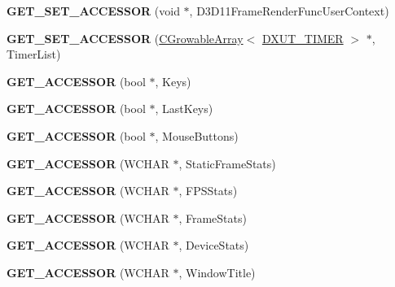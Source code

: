 \begin{DoxyCompactItemize}
\item 
\hypertarget{class_d_x_u_t_state_a4b2e7b40c28cb9a912309f53d393b04c}{{\bfseries G\+E\+T\+\_\+\+S\+E\+T\+\_\+\+A\+C\+C\+E\+S\+S\+O\+R} (void $\ast$, D3\+D11\+Frame\+Render\+Func\+User\+Context)}\label{class_d_x_u_t_state_a4b2e7b40c28cb9a912309f53d393b04c}

\item 
\hypertarget{class_d_x_u_t_state_a33e87175ee78c0a5dff55f181237d7a2}{{\bfseries G\+E\+T\+\_\+\+S\+E\+T\+\_\+\+A\+C\+C\+E\+S\+S\+O\+R} (\hyperlink{class_c_growable_array}{C\+Growable\+Array}$<$ \hyperlink{struct_d_x_u_t___t_i_m_e_r}{D\+X\+U\+T\+\_\+\+T\+I\+M\+E\+R} $>$ $\ast$, Timer\+List)}\label{class_d_x_u_t_state_a33e87175ee78c0a5dff55f181237d7a2}

\item 
\hypertarget{class_d_x_u_t_state_ac428f4c61a8d23b084a0b1c19cd0598e}{{\bfseries G\+E\+T\+\_\+\+A\+C\+C\+E\+S\+S\+O\+R} (bool $\ast$, Keys)}\label{class_d_x_u_t_state_ac428f4c61a8d23b084a0b1c19cd0598e}

\item 
\hypertarget{class_d_x_u_t_state_a8a8d0d2475306023930aad26d793dcc7}{{\bfseries G\+E\+T\+\_\+\+A\+C\+C\+E\+S\+S\+O\+R} (bool $\ast$, Last\+Keys)}\label{class_d_x_u_t_state_a8a8d0d2475306023930aad26d793dcc7}

\item 
\hypertarget{class_d_x_u_t_state_a5e175783f28008da6fb627e41e7fb42b}{{\bfseries G\+E\+T\+\_\+\+A\+C\+C\+E\+S\+S\+O\+R} (bool $\ast$, Mouse\+Buttons)}\label{class_d_x_u_t_state_a5e175783f28008da6fb627e41e7fb42b}

\item 
\hypertarget{class_d_x_u_t_state_a10ba07c1ae189caa70da612eefa31398}{{\bfseries G\+E\+T\+\_\+\+A\+C\+C\+E\+S\+S\+O\+R} (W\+C\+H\+A\+R $\ast$, Static\+Frame\+Stats)}\label{class_d_x_u_t_state_a10ba07c1ae189caa70da612eefa31398}

\item 
\hypertarget{class_d_x_u_t_state_ab396180bd85d5be854658da163a2c8ff}{{\bfseries G\+E\+T\+\_\+\+A\+C\+C\+E\+S\+S\+O\+R} (W\+C\+H\+A\+R $\ast$, F\+P\+S\+Stats)}\label{class_d_x_u_t_state_ab396180bd85d5be854658da163a2c8ff}

\item 
\hypertarget{class_d_x_u_t_state_aebdf3b3dfa93bd3cd58a3411e8f0b2f0}{{\bfseries G\+E\+T\+\_\+\+A\+C\+C\+E\+S\+S\+O\+R} (W\+C\+H\+A\+R $\ast$, Frame\+Stats)}\label{class_d_x_u_t_state_aebdf3b3dfa93bd3cd58a3411e8f0b2f0}

\item 
\hypertarget{class_d_x_u_t_state_a1695dda0b58c0780cc679c5c30fc0d8e}{{\bfseries G\+E\+T\+\_\+\+A\+C\+C\+E\+S\+S\+O\+R} (W\+C\+H\+A\+R $\ast$, Device\+Stats)}\label{class_d_x_u_t_state_a1695dda0b58c0780cc679c5c30fc0d8e}

\item 
\hypertarget{class_d_x_u_t_state_afc8f9df42d8ad7364a76afbc69a1c2ae}{{\bfseries G\+E\+T\+\_\+\+A\+C\+C\+E\+S\+S\+O\+R} (W\+C\+H\+A\+R $\ast$, Window\+Title)}\label{class_d_x_u_t_state_afc8f9df42d8ad7364a76afbc69a1c2ae}

\end{DoxyCompactItemize}
